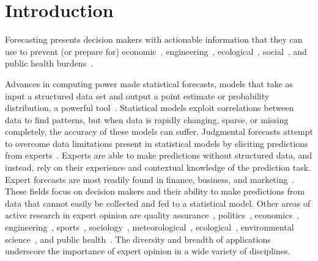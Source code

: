 \documentclass[preprint]{elsarticle}
\begin{document}
\section{Introduction}

Forecasting presents decision makers with actionable information that they can use to prevent (or prepare for) economic~\cite{shin2013robust,huang2016improving,mak1996aggregating}, engineering~\cite{guangliang1996multi,zio1996use,neves2008life}, ecological~\cite{borsuk2004predictive,failing2004using,morales2017characterization,johnson2018making}, social~\cite{cabello2012combination,klas2010support,craig2001bayesian}, and public health burdens~\cite{evans1994use,alho1992estimating}.

Advances in computing power made statistical forecasts, models that take as input a structured data set and output a point estimate or probability distribution, a powerful tool~\cite{wang2016statistical,kune2016anatomy,al2015efficient}. 
Statistical models exploit correlations between data to find patterns, but when data is rapidly changing, sparse, or missing completely, the accuracy of these models can suffer. 
Judgmental forecasts attempt to overcome data limitations present in statistical models by eliciting predictions from experts~\cite{clemen1986combining,clemen1989combining,genest1986combining}.
Experts are able to make predictions without structured data, and instead, rely on their experience and contextual knowledge of the prediction task.
Expert forecasts are most readily found in finance, business, and marketing~\cite{seifert2013relative,shin2013robust,franses2011averaging,petrovic2006fuzzy,alvarado2017expertise,song2013combining,baecke2017investigating,baecke2017investigating,petrovic2006fuzzy,franses2011averaging,song2013combining,alvarado2017expertise,seifert2013relative,kabak2008aggregating}.
These fields focus on decision makers and their ability to make predictions from data that cannot easily be collected and fed to a statistical model.
Other areas of active research in expert opinion are quality assurance~\cite{klas2010support}, politics~\cite{hanea2018value,graefe2014accuracy,graefe2015accuracy,graefe2018predicting,cai2016simple,wang2018bayesian,satopaa2014probability,graefe2014combining}, economics~\cite{shin2013robust,huang2016improving,mak1996aggregating}, engineering~\cite{craig2001bayesian,tartakovsky2007probabilistic,neves2008life,ZIO1996127,BRITO201655,jin2007research,wang2008probabilistic,brito2012behavioral,hathout2016uncertainty,ren2002optimal}, sports~\cite{gu2016expert}, sociology~\cite{cabello2012combination,adams2009acceptability}, meteorological~\cite{abramson1996hailfinder}, ecological~\cite{johnson2018making,borsuk2004predictive,failing2004using,cooke2014out}, environmental science~\cite{morales2017characterization,mantyka2014understanding,li2012preliminary,zio1997accounting}, and public health~\cite{alho1992estimating,EVANS199415,jana2019interval,kurowicka2010probabilistic}.
The diversity and breadth of applications underscore the importance of expert opinion in a wide variety of disciplines.
\end{document}
